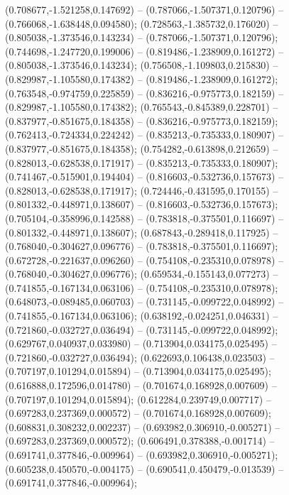  (0.708677,-1.521258,0.147692) -- (0.787066,-1.507371,0.120796) -- (0.766068,-1.638448,0.094580);
 (0.728563,-1.385732,0.176020) -- (0.805038,-1.373546,0.143234) -- (0.787066,-1.507371,0.120796);
 (0.744698,-1.247720,0.199006) -- (0.819486,-1.238909,0.161272) -- (0.805038,-1.373546,0.143234);
 (0.756508,-1.109803,0.215830) -- (0.829987,-1.105580,0.174382) -- (0.819486,-1.238909,0.161272);
 (0.763548,-0.974759,0.225859) -- (0.836216,-0.975773,0.182159) -- (0.829987,-1.105580,0.174382);
 (0.765543,-0.845389,0.228701) -- (0.837977,-0.851675,0.184358) -- (0.836216,-0.975773,0.182159);
 (0.762413,-0.724334,0.224242) -- (0.835213,-0.735333,0.180907) -- (0.837977,-0.851675,0.184358);
 (0.754282,-0.613898,0.212659) -- (0.828013,-0.628538,0.171917) -- (0.835213,-0.735333,0.180907);
 (0.741467,-0.515901,0.194404) -- (0.816603,-0.532736,0.157673) -- (0.828013,-0.628538,0.171917);
 (0.724446,-0.431595,0.170155) -- (0.801332,-0.448971,0.138607) -- (0.816603,-0.532736,0.157673);
 (0.705104,-0.358996,0.142588) -- (0.783818,-0.375501,0.116697) -- (0.801332,-0.448971,0.138607);
 (0.687843,-0.289418,0.117925) -- (0.768040,-0.304627,0.096776) -- (0.783818,-0.375501,0.116697);
 (0.672728,-0.221637,0.096260) -- (0.754108,-0.235310,0.078978) -- (0.768040,-0.304627,0.096776);
 (0.659534,-0.155143,0.077273) -- (0.741855,-0.167134,0.063106) -- (0.754108,-0.235310,0.078978);
 (0.648073,-0.089485,0.060703) -- (0.731145,-0.099722,0.048992) -- (0.741855,-0.167134,0.063106);
 (0.638192,-0.024251,0.046331) -- (0.721860,-0.032727,0.036494) -- (0.731145,-0.099722,0.048992);
 (0.629767,0.040937,0.033980) -- (0.713904,0.034175,0.025495) -- (0.721860,-0.032727,0.036494);
 (0.622693,0.106438,0.023503) -- (0.707197,0.101294,0.015894) -- (0.713904,0.034175,0.025495);
 (0.616888,0.172596,0.014780) -- (0.701674,0.168928,0.007609) -- (0.707197,0.101294,0.015894);
 (0.612284,0.239749,0.007717) -- (0.697283,0.237369,0.000572) -- (0.701674,0.168928,0.007609);
 (0.608831,0.308232,0.002237) -- (0.693982,0.306910,-0.005271) -- (0.697283,0.237369,0.000572);
 (0.606491,0.378388,-0.001714) -- (0.691741,0.377846,-0.009964) -- (0.693982,0.306910,-0.005271);
 (0.605238,0.450570,-0.004175) -- (0.690541,0.450479,-0.013539) -- (0.691741,0.377846,-0.009964);
